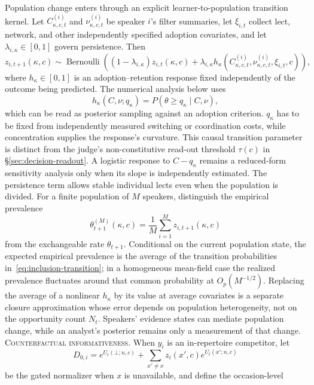 Population change enters through an explicit learner-to-population transition
kernel. Let $C^{(i)}_{\kappa,c,t}$ and $\nu^{(i)}_{\kappa,c,t}$ be speaker $i$'s
filter summaries, let $\xi_{i,t}$ collect lect, network, and other independently
specified adoption covariates, and let $\lambda_{i,\kappa}\in[0,1]$ govern
persistence. Then
\begin{equation}
z_{i,t+1}(\kappa,c)\sim\operatorname{Bernoulli}\!\left(
  (1-\lambda_{i,\kappa})z_{i,t}(\kappa,c)+
  \lambda_{i,\kappa}h_\kappa(C^{(i)}_{\kappa,c,t},
    \nu^{(i)}_{\kappa,c,t},\xi_{i,t},c)\right),
\label{eq:inclusion-transition}
\end{equation}
where $h_\kappa\in[0,1]$ is an adoption--retention response fixed independently
of the outcome being predicted. The numerical analysis below uses
\begin{equation}
h_\kappa(C,\nu;q_\kappa)=
P(\theta\geq q_\kappa\mid C,\nu),
\label{eq:posterior-threshold-adoption}
\end{equation}
which can be read as posterior sampling against an adoption criterion.
$q_\kappa$ has to be fixed from independently measured switching or coordination
costs, while concentration supplies the response's curvature. This causal
transition parameter is distinct from the judge's non-constitutive read-out
threshold $\tau(c)$ in \S\ref{sec:decision-readout}. A logistic
response to $C-q_\kappa$ remains a reduced-form sensitivity analysis only when
its slope is independently estimated. The persistence term allows stable individual
lects even when the population is divided. For a finite population of $M$
speakers, distinguish the empirical prevalence
\[
\theta^{(M)}_{t+1}(\kappa,c)=\frac{1}{M}\sum_{i=1}^{M}
z_{i,t+1}(\kappa,c)
\]
from the exchangeable rate $\theta_{t+1}$. Conditional on the current population
state, the expected empirical prevalence is the average of the transition
probabilities in~\eqref{eq:inclusion-transition}; in a homogeneous mean-field
case the realized prevalence fluctuates around that common probability at
$O_p(M^{-1/2})$. Replacing the average of a nonlinear $h_\kappa$ by its value at
average covariates is a separate closure approximation whose error depends on
population heterogeneity, not on the opportunity count $N_t$. Speakers'
evidence states can mediate population change, while an analyst's
posterior remains only a measurement of that change.
\noindent\textsc{Counterfactual informativeness.} When $y_i$ is an
in-repertoire competitor, let
\[
D_{0,i}=e^{U_t(\bot;n,c)}+
  \sum_{x'\ne x}z_i(x',c)e^{U_t(x';n,c)}
\]
be the gated normalizer when $x$ is unavailable, and define the occasion-level

